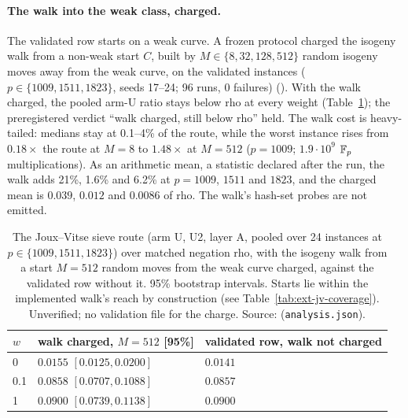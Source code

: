 \paragraph{The walk into the weak class, charged.} The validated row
starts on a weak curve. A frozen protocol charged the isogeny walk from a
non-weak start $C$, built by $M\in\{8,32,128,512\}$ random isogeny moves
away from the weak curve, on the validated instances ($p\in\{1009,1511,1823\}$,
seeds 17--24; 96 runs, 0 failures)
(). With the walk charged,
the pooled arm-U ratio stays below rho at every weight
(Table~\ref{tab:ext-jv-walk}); the preregistered verdict ``walk charged,
still below rho'' held. The walk cost is heavy-tailed: medians stay at
0.1--4\% of the route, while the worst instance rises from $0.18\times$
the route at $M=8$ to $1.48\times$ at $M=512$ ($p=1009$;
$1.9\cdot10^9$ $\mathbb{F}_p$ multiplications). As an arithmetic mean, a
statistic declared after the run, the walk adds 21\%, 1.6\% and 6.2\% at
$p=1009$, $1511$ and $1823$, and the charged mean is $0.039$, $0.012$ and
$0.0086$ of rho. The walk's hash-set probes are not emitted.

\begin{table}[t]
\centering\small
\begin{tabular}{@{}lll@{}}
\toprule
$w$ & walk charged, $M=512$ [95\%] & validated row, walk not charged \\
\midrule
0 & $0.0155$ $[0.0125,0.0200]$ & $0.0141$ \\
0.1 & $0.0858$ $[0.0707,0.1088]$ & $0.0857$ \\
1 & $0.0900$ $[0.0739,0.1138]$ & $0.0900$ \\
\bottomrule
\end{tabular}
\caption[]{The Joux--Vitse sieve route (arm U, U2, layer A, pooled over 24
instances at $p\in\{1009,1511,1823\}$) over matched negation rho, with
the isogeny walk from a start $M=512$ random moves from the weak curve
charged, against the validated row without it. 95\% bootstrap
intervals. Starts lie within the implemented walk's reach by
construction (see Table~\ref{tab:ext-jv-coverage}). Unverified; no
validation file for the charge. Source:
(\texttt{analysis.json}).}
\label{tab:ext-jv-walk}
\end{table}

